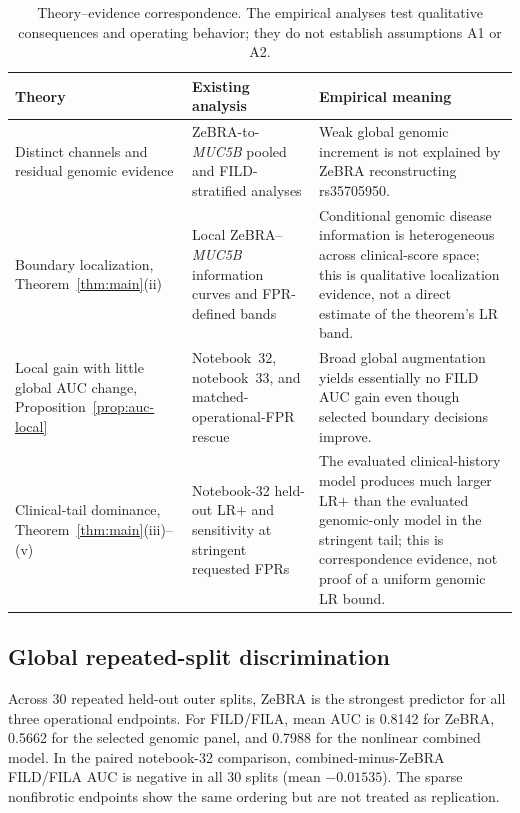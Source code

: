 {\begin{table}[!t]
\caption{Theory--evidence correspondence. The empirical analyses test qualitative consequences and operating behavior; they do not establish assumptions A1 or A2.}
\label{tab:theory-evidence-map}
\centering\footnotesize\setlength{\tabcolsep}{5pt}
\begin{tabular}{p{}p{}p{}}
\toprule
Theory & Existing analysis & Empirical meaning\\
\midrule
Distinct channels and residual genomic evidence & ZeBRA-to-\textit{MUC5B} pooled and FILD-stratified analyses & Weak global genomic increment is not explained by ZeBRA reconstructing rs35705950.\\
Boundary localization, Theorem~\ref{thm:main}(ii) & Local ZeBRA--\textit{MUC5B} information curves and FPR-defined bands & Conditional genomic disease information is heterogeneous across clinical-score space; this is qualitative localization evidence, not a direct estimate of the theorem's LR band.\\
Local gain with little global AUC change, Proposition~\ref{prop:auc-local} & Notebook~32, notebook~33, and matched-operational-FPR rescue & Broad global augmentation yields essentially no FILD AUC gain even though selected boundary decisions improve.\\
Clinical-tail dominance, Theorem~\ref{thm:main}(iii)--(v) & Notebook-32 held-out LR$+$ and sensitivity at stringent requested FPRs & The evaluated clinical-history model produces much larger LR$+$ than the evaluated genomic-only model in the stringent tail; this is correspondence evidence, not proof of a uniform genomic LR bound.\\
\bottomrule
\end{tabular}
\end{table}

\subsection{Global repeated-split discrimination}
Across 30 repeated held-out outer splits, ZeBRA is the strongest predictor for all three operational endpoints. For FILD/FILA, mean AUC is 0.8142 for ZeBRA, 0.5662 for the selected genomic panel, and 0.7988 for the nonlinear combined model. In the paired notebook-32 comparison, combined-minus-ZeBRA FILD/FILA AUC is negative in all 30 splits (mean $-0.01535$). The sparse nonfibrotic endpoints show the same ordering but are not treated as replication.

}
